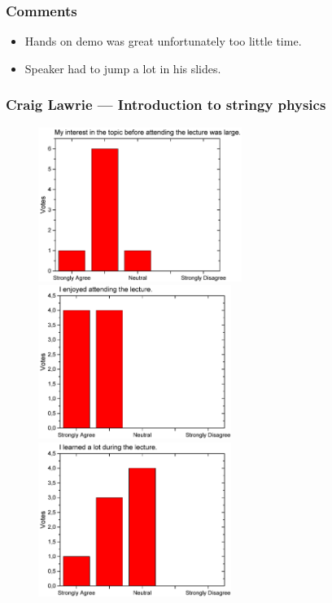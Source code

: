 \subsubsection*{Comments}
\begin{itemize}
\item Hands on demo was great unfortunately too little time.
\item Speaker had to jump a lot in his slides.
\end{itemize}
\newpage


\subsubsection{Craig Lawrie  --- Introduction to stringy physics }
\begin{figure}[h!]
  \centering
  \begin{minipage}{.48\linewidth}
    \centering
      {\includegraphics[height=50mm]{figures/n/Graph91.pdf}}
      {\includegraphics[height=50mm]{figures/n/Graph92.pdf}}
      {\includegraphics[height=50mm]{figures/n/Graph93.pdf}}

\end{minipage}
\end{figure}

